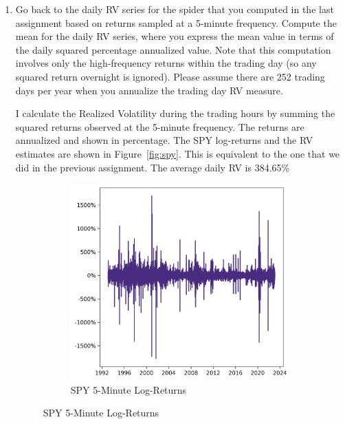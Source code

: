 \documentclass[12pt,twoside]{article}
\begin{document}
\begin{enumerate}[label = \arabic*)]
    \item Go back to the daily RV series for the spider that you computed in the last assignment based on returns sampled at a 5-minute frequency. Compute the mean for the daily RV series, where you express the mean value in terms of the daily squared percentage annualized value. Note that this computation involves only the high-frequency returns within the trading day (so any squared return overnight is ignored). Please assume there are 252 trading days per year when you annualize the trading day RV measure.
    
    \begin{solution}
        I calculate the Realized Volatility during the trading hours by summing the squared returns observed at the 5-minute frequency. The returns are annualized and shown in percentage. The SPY log-returns and the RV estimates are shown in Figure~\ref{fig:spy}. This is equivalent to the one that we did in the previous assignment. The average daily RV is 384.65\%
        \begin{figure}[!htbp]
            \centering
            \caption{5-Minute SPY returns and variance}
            \label{fig:spy}
            \begin{subfigure}[b]{0.45\textwidth}
              \includegraphics[width=\textwidth]{images/spy_returns.png}
              \caption{SPY 5-Minute Log-Returns}
              \label{fig:spy_returns}

\end{subfigure}
\end{figure}
\end{solution}
\end{enumerate}
\end{document}
